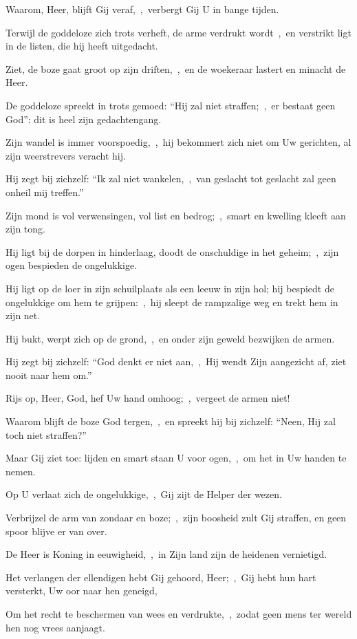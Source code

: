 \documentclass[12pt,twoside,a5paper]{article}
\begin{document}
\begin{halfparskip}
  Waarom, Heer, blijft Gij veraf,~\sep\ verbergt Gij U in bange tijden.


  Terwijl de goddeloze zich trots verheft, de arme verdrukt wordt~\sep\ en verstrikt ligt in de listen, die hij heeft uitgedacht.

  Ziet, de boze gaat groot op zijn driften,~\sep\ en de woekeraar lastert en minacht de Heer.

  De goddeloze spreekt in trots gemoed: ``Hij zal niet straffen;~\sep\ er bestaat geen God'': dit is heel zijn gedachtengang.

  Zijn wandel is immer voorspoedig,~\sep\ hij bekommert zich niet om Uw gerichten, al zijn weerstrevers veracht hij.

  Hij zegt bij zichzelf: ``Ik zal niet wankelen,~\sep\ van geslacht tot geslacht zal geen onheil mij treffen.''

  Zijn mond is vol verwensingen, vol list en bedrog;~\sep\ smart en kwelling kleeft aan zijn tong.

  Hij ligt bij de dorpen in hinderlaag, doodt de onschuldige in het geheim;~\sep\ zijn ogen bespieden de ongelukkige.

  Hij ligt op de loer in zijn schuilplaats als een leeuw in zijn hol; hij bespiedt de ongelukkige om hem te grijpen:~\sep\ hij sleept de rampzalige weg en trekt hem in zijn net.

  Hij bukt, werpt zich op de grond,~\sep\ en onder zijn geweld bezwijken de armen.

  Hij zegt bij zichzelf: ``God denkt er niet aan,~\sep\ Hij wendt Zijn aangezicht af, ziet nooit naar hem om.''
\end{halfparskip}


\begin{halfparskip}
  Rijs op, Heer, God, hef Uw hand omhoog;~\sep\ vergeet de armen niet!

  Waarom blijft de boze God tergen,~\sep\ en spreekt hij bij zichzelf: ``Neen, Hij zal toch niet straffen?''

  Maar Gij ziet toe: lijden en smart staan U voor ogen,~\sep\ om het in Uw handen te nemen.

  Op U verlaat zich de ongelukkige,~\sep\ Gij zijt de Helper der wezen.

  Verbrijzel de arm van zondaar en boze;~\sep\ zijn boosheid zult Gij straffen, en geen spoor blijve er van over.

  De Heer is Koning in eeuwigheid,~\sep\ in Zijn land zijn de heidenen vernietigd.

  Het verlangen der ellendigen hebt Gij gehoord, Heer;~\sep\ Gij hebt hun hart versterkt, Uw oor naar hen geneigd,

  Om het recht te beschermen van wees en verdrukte,~\sep\ zodat geen mens ter wereld hen nog vrees aanjaagt.
\end{halfparskip}
\end{document}
